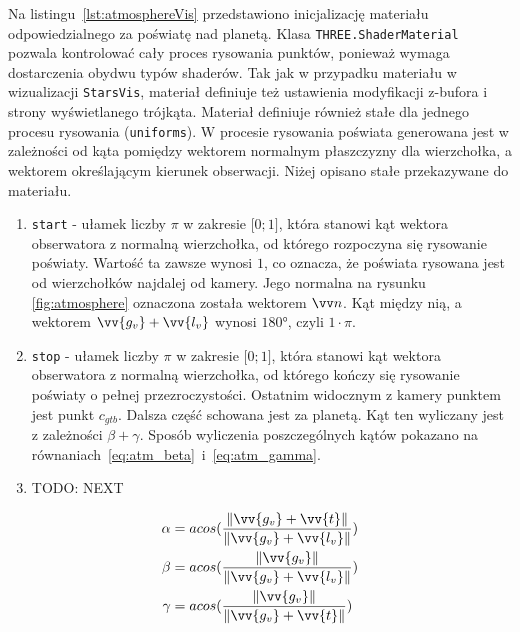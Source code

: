 Na listingu~\ref{lst:atmosphereVis} przedstawiono inicjalizację materiału odpowiedzialnego za poświatę nad planetą. Klasa \texttt{THREE.ShaderMaterial} pozwala kontrolować cały proces rysowania punktów, ponieważ wymaga dostarczenia obydwu typów shaderów. Tak jak w przypadku materiału w wizualizacji \texttt{StarsVis}, materiał definiuje też ustawienia modyfikacji z-bufora i strony wyświetlanego trójkąta. Materiał definiuje również stałe dla jednego procesu rysowania (\texttt{uniforms}). 
W procesie rysowania poświata generowana jest w zależności od kąta pomiędzy wektorem normalnym płaszczyzny dla wierzchołka, a wektorem określającym kierunek obserwacji. Niżej opisano stałe przekazywane do materiału.

\begin{enumerate}

  \item \texttt{start} - ułamek liczby $\pi$ w zakresie $\lbrack0; 1\rbrack$, która stanowi kąt wektora obserwatora z normalną wierzchołka, od którego rozpoczyna się rysowanie poświaty. Wartość ta zawsze wynosi $1$, co oznacza, że poświata rysowana jest od wierzchołków najdalej od kamery. Jego normalna na rysunku \ref{fig:atmosphere} oznaczona została wektorem $\vv n$. Kąt między nią, a wektorem $\vv{g_v} + \vv{l_v}$ wynosi $\ang{180}$, czyli $1 \cdot \pi$.
  \item \texttt{stop} - ułamek liczby $\pi$ w zakresie $\lbrack0; 1\rbrack$, która stanowi kąt wektora obserwatora z normalną wierzchołka, od którego kończy się rysowanie poświaty o pełnej przezroczystości. Ostatnim widocznym z kamery punktem jest punkt $c_{gtb}$. Dalsza część schowana jest za planetą. Kąt ten wyliczany jest z zależności $\beta+\gamma$. Sposób wyliczenia poszczególnych kątów pokazano na równaniach~\ref{eq:atm_beta}~i~\ref{eq:atm_gamma}.
  \item TODO: NEXT
\end{enumerate}

\begin{align}
  \label{eq:atm_alfa}
  \alpha &= acos(\frac{\length{\vv{g_v}+\vv{t}}}{\length{\vv{g_v}+\vv{l_v}}}) \\
  \label{eq:atm_beta}
  \beta &= acos(\frac{\length{\vv{g_v}}}{\length{\vv{g_v}+\vv{l_v}}}) \\
  \label{eq:atm_gamma}
  \gamma &= acos(\frac{\length{\vv{g_v}}}{\length{\vv{g_v}+\vv{t}}})
\end{align}
